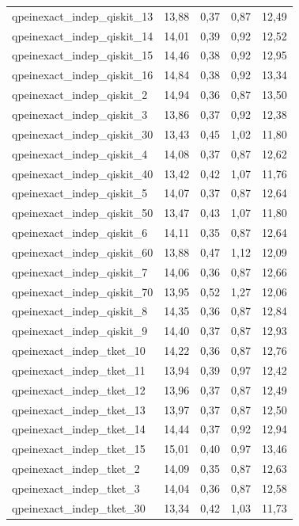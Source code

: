 \begin{longtable}{lrrrr}
qpeinexact\_indep\_qiskit\_13 & 13,88 & 0,37 & 0,87 & 12,49 \\
qpeinexact\_indep\_qiskit\_14 & 14,01 & 0,39 & 0,92 & 12,52 \\
qpeinexact\_indep\_qiskit\_15 & 14,46 & 0,38 & 0,92 & 12,95 \\
qpeinexact\_indep\_qiskit\_16 & 14,84 & 0,38 & 0,92 & 13,34 \\
qpeinexact\_indep\_qiskit\_2 & 14,94 & 0,36 & 0,87 & 13,50 \\
qpeinexact\_indep\_qiskit\_3 & 13,86 & 0,37 & 0,92 & 12,38 \\
qpeinexact\_indep\_qiskit\_30 & 13,43 & 0,45 & 1,02 & 11,80 \\
qpeinexact\_indep\_qiskit\_4 & 14,08 & 0,37 & 0,87 & 12,62 \\
qpeinexact\_indep\_qiskit\_40 & 13,42 & 0,42 & 1,07 & 11,76 \\
qpeinexact\_indep\_qiskit\_5 & 14,07 & 0,37 & 0,87 & 12,64 \\
qpeinexact\_indep\_qiskit\_50 & 13,47 & 0,43 & 1,07 & 11,80 \\
qpeinexact\_indep\_qiskit\_6 & 14,11 & 0,35 & 0,87 & 12,64 \\
qpeinexact\_indep\_qiskit\_60 & 13,88 & 0,47 & 1,12 & 12,09 \\
qpeinexact\_indep\_qiskit\_7 & 14,06 & 0,36 & 0,87 & 12,66 \\
qpeinexact\_indep\_qiskit\_70 & 13,95 & 0,52 & 1,27 & 12,06 \\
qpeinexact\_indep\_qiskit\_8 & 14,35 & 0,36 & 0,87 & 12,84 \\
qpeinexact\_indep\_qiskit\_9 & 14,40 & 0,37 & 0,87 & 12,93 \\
qpeinexact\_indep\_tket\_10 & 14,22 & 0,36 & 0,87 & 12,76 \\
qpeinexact\_indep\_tket\_11 & 13,94 & 0,39 & 0,97 & 12,42 \\
qpeinexact\_indep\_tket\_12 & 13,96 & 0,37 & 0,87 & 12,49 \\
qpeinexact\_indep\_tket\_13 & 13,97 & 0,37 & 0,87 & 12,50 \\
qpeinexact\_indep\_tket\_14 & 14,44 & 0,37 & 0,92 & 12,94 \\
qpeinexact\_indep\_tket\_15 & 15,01 & 0,40 & 0,97 & 13,46 \\
qpeinexact\_indep\_tket\_2 & 14,09 & 0,35 & 0,87 & 12,63 \\
qpeinexact\_indep\_tket\_3 & 14,04 & 0,36 & 0,87 & 12,58 \\
qpeinexact\_indep\_tket\_30 & 13,34 & 0,42 & 1,03 & 11,73 \\

\end{longtable}
